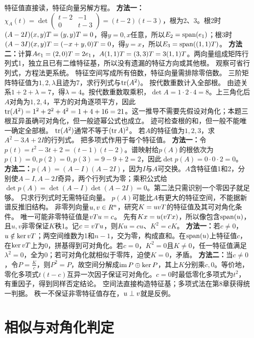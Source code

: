 {特征值直接读，特征向量另解方程。}
{\textbf{方法一：}$\chi_A(t)=\det\begin{pmatrix}t-2&-1\\0&t-3\end{pmatrix}=(t-2)(t-3)$，根为2、3。根2时$(A-2I)(x,y)T=(y,y)T=0$，得$y=0,x$任意，所以$E_2=\operatorname{span}(e_1)$；根3时$(A-3I)(x,y)T=(-x+y,0)T=0$，得$y=x$，所以$E_3=\operatorname{span}((1,1)T)$。
\textbf{方法二：}计算$Ae_1=(2,0)T=2e_1$，$A(1,1)T=(3,3)T=3(1,1)T$。两向量组成矩阵行列式1，独立且已有二维特征基，所以没有遗漏的特征方向或其他根。}
{观察可省行列式，方程法更系统。}
{特征空间写成所有倍数，特征向量需排除零倍数。}
{三阶矩阵特征值为$1,2,\lambda$且迹为7，求行列式与$\operatorname{tr}(A^2)$。}
{按代数重数计入全部根。}
{由迹关系$1+2+\lambda=7$，得$\lambda=4$。按代数重数取乘积，$\det A=1\cdot2\cdot4=8$。上三角化后$A$对角为$1,2,4$，平方的对角逐项平方，因此$\operatorname{tr}(A^2)=1^2+2^2+4^2=1+4+16=21$。这一推导不需要先假设对角化；本题三根互异虽确可对角化，但一般迹幂公式也成立。}
{迹可检查根的和，但一般不能唯一确定全部根。}
{$\operatorname{tr}(A^2)$通常不等于$(\operatorname{tr} A)^2$。}
{若$A$的特征值为$1,2,3$，求$A^2-3A+2I$的行列式。}
{把多项式作用于每个特征值。}
{\textbf{方法一：}令$p(t)=t^2-3t+2=(t-1)(t-2)$。谱映射给$p(A)$的根依次为$p(1)=0,p(2)=0,p(3)=9-9+2=2$，因此$\det p(A)=0\cdot0\cdot2=0$。
\textbf{方法二：}$p(A)=(A-I)(A-2I)$，因为$I$与$A$可交换。$A$含特征值1和2，分别使$A-I,A-2I$奇异，两个行列式为零；乘积公式给$\det p(A)=\det(A-I)\det(A-2I)=0$。第二法只需识别一个零因子就足够。}
{只求行列式时无需特征向量。}
{$p(A)$可能比$A$有更大的特征空间，不能据新谱反推旧结构。}
{非零列向量$u,v\in R^n$，研究$K=uvT$的特征值及其可对角化条件。}
{唯一可能非零特征值是$vTu=c$。}
{先有$Kx=u(vT x)$，所以像包含$\operatorname{span}(u)$，且$u,v$非零保证$K$秩1。记$c=vT u$，则$Ku=cu$、$K^2=cK$。
\textbf{方法一：}若$c\ne0$，$u\notin\ker vT$；两空间维数为1和$n-1$，交为零，构成直和。在$\operatorname{span}(u)$上特征值$c$，在$\ker vT$上为0，拼基得到可对角化。若$c=0$，$K^2=0$且$K\ne0$，任一特征值满足$\lambda^2=0$，全为0；若可对角化就相似于零阵，迫使$K=0$，矛盾。
\textbf{方法二：}当$c\ne0$，令$P=\frac{K}{c}$，则$P^2=P$，故空间分解成$\operatorname{im} P\oplus\ker P$，其上$K$分别乘$c,0$。等价地，零化多项式$t(t-c)$互异一次因子保证可对角化。$c=0$时最低零化多项式为$t^2$，有重因子，得到同样否定结论。}
{空间法直接构造特征基；多项式法在第8章获得统一判据。}
{秩一不保证非零特征值存在，$u\perp v$就是反例。}
\section{相似与对角化判定}
